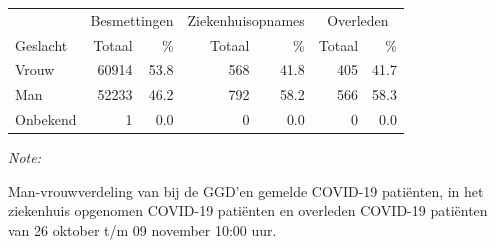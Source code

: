 \documentclass[
  english,
  man,floatsintext]{apa6}
\begin{document}
\begin{table}[H]
\centering\begingroup\fontsize{11}{13}\selectfont

\begin{threeparttable}
\begin{tabular}{lrrrrrr}
\toprule
\multicolumn{1}{c}{ } & \multicolumn{2}{c}{Besmettingen} & \multicolumn{2}{c}{Ziekenhuisopnames} & \multicolumn{2}{c}{Overleden} \\
\cmidrule(l{3pt}r{3pt}){2-3} \cmidrule(l{3pt}r{3pt}){4-5} \cmidrule(l{3pt}r{3pt}){6-7}
Geslacht & Totaal & \% & Totaal & \% & Totaal & \%\\
\midrule
Vrouw & 60914 & 53.8 & 568 & 41.8 & 405 & 41.7\\
Man & 52233 & 46.2 & 792 & 58.2 & 566 & 58.3\\
Onbekend & 1 & 0.0 & 0 & 0.0 & 0 & 0.0\\
\bottomrule
\end{tabular}
\begin{tablenotes}
\item \textit{Note: } 
\item Man-vrouwverdeling van bij de GGD’en gemelde COVID-19 patiënten, in het ziekenhuis opgenomen COVID-19 patiënten en overleden COVID-19 patiënten van 26 oktober t/m 09 november 10:00 uur.
\end{tablenotes}
\end{threeparttable}
\endgroup{}
\end{table}
\newpage
\end{document}
